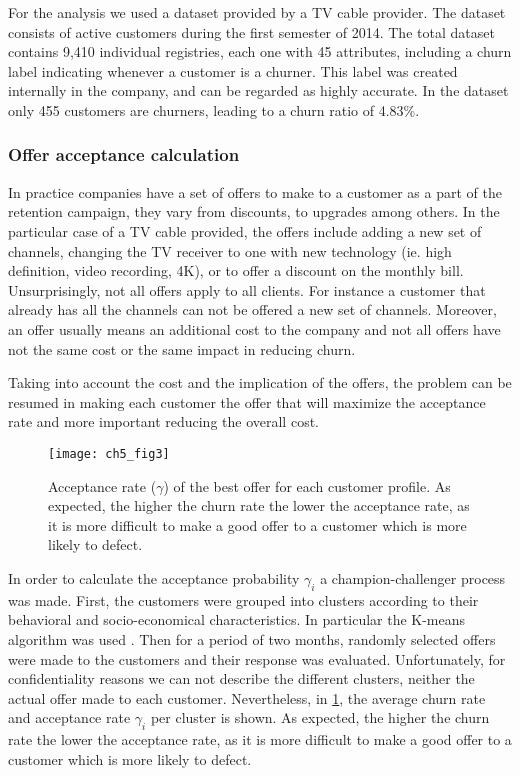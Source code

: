For the analysis we used a dataset provided by a TV cable provider. 
The dataset consists of active customers during the first semester of 2014. 	
The total dataset contains 9,410 individual registries, each one with 45 attributes, 
including a churn label indicating whenever a customer is a churner.
This label was created internally in the company, and can be regarded as highly accurate. 
In the dataset only 455 customers are churners, leading to a churn ratio of 4.83\%.
	
\subsubsection{Offer acceptance calculation}

In practice companies have a set of offers to make to a customer as a part of the retention 
campaign, they vary from discounts, to upgrades among others. In the particular case of a TV cable 
provided, the offers include adding a new set of channels, changing the TV receiver to one with new 
technology (ie. high definition, video recording, 4K),  or to offer a discount on the monthly bill.
Unsurprisingly, not all offers apply to all clients. For instance a customer that already has all 
the channels can not be offered a new set of channels. Moreover, an offer usually means an 
additional cost to the company and not all offers have not the same cost or the same impact in 
reducing churn.

Taking into account the cost and the implication of the offers, the problem can be 
resumed in making each customer the offer that will maximize the acceptance rate and more 
important reducing the overall cost. 

\begin{figure}[t!]
  \centering
   \texttt{[image: ch5\_fig3]}
  \caption{Acceptance rate ($\gamma$) of the best offer for each customer profile. As expected, 
	the higher the churn rate the lower the acceptance rate, as it is more difficult to make a 
	good offer to a customer which is more likely to defect. }
  \label{fig:ch5:3}
\end{figure}

In order to calculate the acceptance probability $\gamma_i$ a champion-challenger process was made. 
First, the customers were grouped into clusters according to their behavioral and socio-economical 
characteristics. In particular the K-means algorithm was used \citep{Marslan2009}.
Then for a period of two months, randomly selected offers were made to the customers and their 
response was evaluated. Unfortunately, for confidentiality reasons we can not describe the 
different clusters, neither the actual offer made to each customer. Nevertheless, in \figurename{ 
\ref{fig:ch5:3}}, the average churn rate and acceptance rate $\gamma_i$ per cluster is shown. As 
expected, the higher the churn rate the lower the acceptance rate, as it is more difficult to make a 
good offer to a customer which is more likely to defect.


